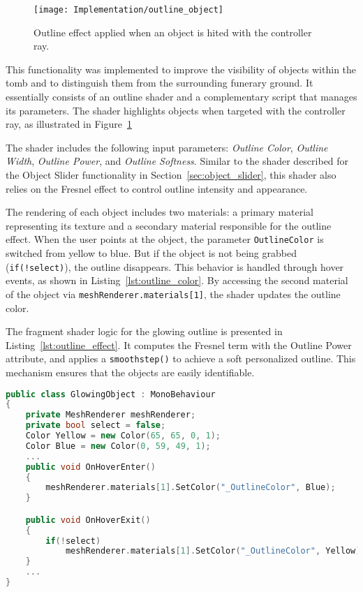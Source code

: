  \begin{figure}[h!]
    \centering
    \texttt{[image: Implementation/outline\_object]}
    \caption{Outline effect applied when an object is hited with the controller ray.}
    \label{fig:outline_object}    
\end{figure}


This functionality was implemented to improve the visibility of objects within the tomb and to distinguish them from the surrounding funerary ground.  
It essentially consists of an outline shader and a complementary script that manages its parameters. 
The shader highlights objects when targeted with the controller ray, as illustrated in Figure~\ref{fig:outline_object}

The shader includes the following input parameters: \emph{Outline Color}, \emph{Outline Width}, \emph{Outline Power}, and \emph{Outline Softness}.  
Similar to the shader described for the Object Slider functionality in Section~\ref{sec:object_slider}, this shader also relies on the Fresnel effect to control outline intensity and appearance.  

The rendering of each object includes two materials: a primary material representing its texture and a secondary material responsible for the outline effect.
When the user points at the object, the parameter \texttt{OutlineColor} is switched from yellow to blue. But if the object is not being grabbed (\texttt{if(!select)}), the outline disappears. 
This behavior is handled through hover events, as shown in Listing~\ref{lst:outline_color}. 
By accessing the second material of the object via \texttt{meshRenderer.materials[1]}, the shader updates the outline color.  

The fragment shader logic for the glowing outline is presented in Listing~\ref{lst:outline_effect}. 
It computes the Fresnel term with the Outline Power attribute, and applies a \texttt{smoothstep()} to achieve a soft personalized outline.  
This mechanism ensures that the objects are easily identifiable. 

\begin{lstlisting}[language=C++, caption={Partial class with Outline Color changed when the object is Hovered.}, label={lst:outline_color},float]
    public class GlowingObject : MonoBehaviour
{
    private MeshRenderer meshRenderer;
    private bool select = false;
    Color Yellow = new Color(65, 65, 0, 1);
    Color Blue = new Color(0, 59, 49, 1);
    ...
    public void OnHoverEnter()
    {
        meshRenderer.materials[1].SetColor("_OutlineColor", Blue);
    }

    public void OnHoverExit()
    {
        if(!select)
            meshRenderer.materials[1].SetColor("_OutlineColor", Yellow);
    }
    ...
}
\end{lstlisting}


